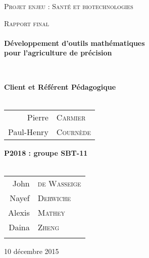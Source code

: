 \begin{titlepage}
\begin{center}


\vfill 

\textsc{\Large Projet enjeu : Santé et biotechnologies}\\[0.5cm]

\vfill

\textsc{\Large Rapport final}\\[1.5cm] 

\HRule \\[0.4cm]
{ \LARGE \bfseries Développement d'outils mathématiques \\ 
   pour l'agriculture de précision \\[0.4cm] }

\HRule \\[1.5cm]

\vfill

{\large
\begin{center}
  \textbf{Client et Référent Pédagogique} \\~\\
\begin{tabular}{rl}
   \quad Pierre &\textsc{Carmier} \\
    \quad Paul-Henry &\textsc{Courn\`ede} \\
  
\end{tabular}
\end{center}
\vfill
\begin{center}
  \textbf{P2018 : groupe SBT-11} \\~\\
  
\begin{tabular}{rl}

    \quad John &\textsc{de Wasseige} \\
    \quad Nayef &\textsc{Derwiche} \\
    \quad Alexis &\textsc{Mathey} \\
    \quad Daina &\textsc{Zheng} \\ \\
\end{tabular}
\end{center}
}

\vfill

{\large 10 décembre 2015}

\end{center}
\end{titlepage}